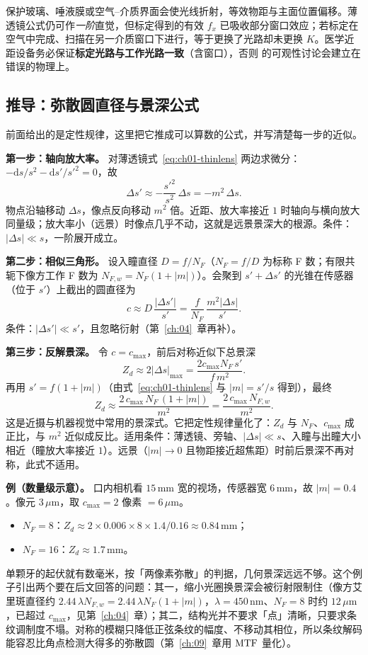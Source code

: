 保护玻璃、唾液膜或空气–介质界面会使光线折射，等效物距与主面位置偏移。薄透镜公式仍可作\textit{一阶}直觉，但标定得到的有效 $f_x$ 已吸收部分窗口效应；若标定在空气中完成、扫描在另一介质窗口下进行，等于更换了光路却未更换 $K$。医学近距设备务必保证\textbf{标定光路与工作光路一致}（含窗口），否则  的可观性讨论会建立在错误的物理上。

\subsection{推导：弥散圆直径与景深公式}

前面给出的是定性规律，这里把它推成可以算数的公式，并写清楚每一步的近似。

\textbf{第一步：轴向放大率。} 对薄透镜式~\eqref{eq:ch01-thinlens} 两边求微分：$-\mathrm{d}s/s^2-\mathrm{d}s'/s'^2=0$，故
\[
  \Delta s'\approx-\frac{s'^2}{s^2}\,\Delta s=-m^2\,\Delta s .
\]
物点沿轴移动 $\Delta s$，像点反向移动 $m^2$ 倍。近距、放大率接近 $1$ 时轴向与横向放大同量级；放大率小（远景）时像点几乎不动，这就是远景景深大的根源。条件：$|\Delta s|\ll s$，一阶展开成立。

\textbf{第二步：相似三角形。} 设入瞳直径 $D=f/N_F$（$N_F=f/D$ 为标称 F 数；有限共轭下像方工作 F 数为 $N_{F,w}=N_F(1+|m|)$）。会聚到 $s'+\Delta s'$ 的光锥在传感器（位于 $s'$）上截出的圆直径为
\[
  c\approx D\,\frac{|\Delta s'|}{s'}=\frac{f}{N_F}\,\frac{m^2|\Delta s|}{s'} .
\]
条件：$|\Delta s'|\ll s'$，且忽略衍射（第~\ref{ch:04}~章再补）。

\textbf{第三步：反解景深。} 令 $c=c_{\max}$，前后对称近似下总景深
\[
  Z_d\approx 2|\Delta s|_{\max}=\frac{2c_{\max}N_F\,s'}{f\,m^2}.
\]
再用 $s'=f(1+|m|)$（由式~\eqref{eq:ch01-thinlens} 与 $|m|=s'/s$ 得到），最终
\begin{equation}
  Z_d\approx\frac{2\,c_{\max}\,N_F\,(1+|m|)}{m^{2}}=\frac{2\,c_{\max}\,N_{F,w}}{m^{2}} .
  \label{eq:ch01-dof}
\end{equation}
这是近摄与机器视觉中常用的景深式。它把定性规律量化了：$Z_d$ 与 $N_F$、$c_{\max}$ 成正比，与 $m^2$ 近似成反比。适用条件：薄透镜、旁轴、$|\Delta s|\ll s$、入瞳与出瞳大小相近（瞳放大率接近 $1$）。远景（$|m|\to0$ 且物距接近超焦距）时前后景深不再对称，此式不适用。

\textbf{例（数量级示意）。} 口内相机看 $15\,\mathrm{mm}$ 宽的视场，传感器宽 $6\,\mathrm{mm}$，故 $|m|=0.4$。像元 $3\,\mu\mathrm{m}$，取 $c_{\max}=2$ 像素 $=6\,\mu\mathrm{m}$。
\begin{itemize}
  \item $N_F=8$：$Z_d\approx2\times0.006\times8\times1.4/0.16\approx0.84\,\mathrm{mm}$；
  \item $N_F=16$：$Z_d\approx1.7\,\mathrm{mm}$。
\end{itemize}
单颗牙的起伏就有数毫米，按「两像素弥散」的判据，几何景深远远不够。这个例子引出两个要在后文回答的问题：其一，缩小光圈换景深会被衍射限制住（像方艾里斑直径约 $2.44\,\lambda N_{F,w}=2.44\,\lambda N_F(1+|m|)$，$\lambda=450\,\mathrm{nm}$、$N_F=8$ 时约 $12\,\mu\mathrm{m}$，已超过 $c_{\max}$，见第~\ref{ch:04}~章）；其二，结构光并不要求「点」清晰，只要求条纹调制度不塌。对称的模糊只降低正弦条纹的幅度、不移动其相位，所以条纹解码能容忍比角点检测大得多的弥散圆（第~\ref{ch:09}~章用 $\mathrm{MTF}$ 量化）。

